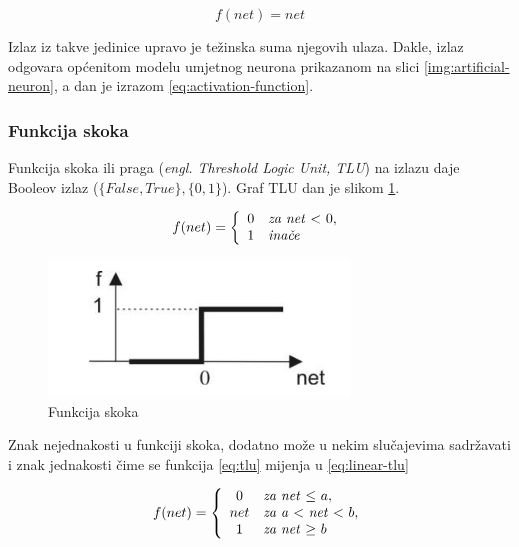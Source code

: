 \begin{equation}
f(net) = net
\label{eq:Adaline}
\end{equation}

Izlaz iz takve jedinice upravo je težinska suma njegovih ulaza. Dakle, izlaz odgovara općenitom modelu umjetnog neurona prikazanom na slici \ref{img:artificial-neuron}, a dan je izrazom \ref{eq:activation-function}.

\subsubsection{Funkcija skoka}

Funkcija skoka ili praga (\textit{engl. Threshold Logic Unit, TLU}) na izlazu daje Booleov izlaz ($\{False, True\}, \{0, 1\}$). Graf TLU dan je slikom \ref{img:tlu}.

\begin{equation}
f(net)=\left\{
\begin{array}{c l}	
     0 & $\textit{za net} $ < $ $ 0,\\
     1 & $\textit{inače}$
\end{array}\right.
\label{eq:tlu}
\end{equation}

\begin{figure}[H]
\centering
\includegraphics[width=8cm]{img/TLU.png}
\caption{Funkcija skoka}
\label{img:tlu}
\end{figure}

Znak nejednakosti u funkciji skoka, dodatno može u nekim slučajevima sadržavati i znak jednakosti čime se funkcija \ref{eq:tlu} mijenja u \ref{eq:linear-tlu}

\begin{equation}
f(net)=\left\{
\begin{array}{c l}	
     0   & $\textit{za net} $ \leq $ $ a,\\
     net & $\textit{za a} $ < $ \textit{net} $ < $ $ b,\\
     1   & $\textit{za net} $ \geq $ $ b
\end{array}\right.
\label{eq:linear-tlu}
\end{equation}

